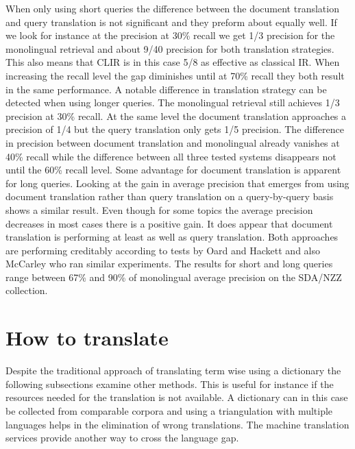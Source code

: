 \documentclass[journal]{IEEEtran}
\begin{document}
When only using short queries the difference between the document translation and query translation is not significant and they preform about equally well.
If we look for instance at the precision at 30\% recall we get 1/3 precision for the monolingual retrieval and about 9/40 precision for both translation strategies.
This also means that CLIR is in this case 5/8 as effective as classical IR.
When increasing the recall level the gap diminishes until at 70\% recall they both result in the same performance.
A notable difference in translation strategy can be detected when using longer queries.
The monolingual retrieval still achieves 1/3 precision at 30\% recall.
At the same level the document translation approaches a precision of 1/4 but the query translation only gets 1/5 precision.
The difference in precision between document translation and monolingual already vanishes at 40\% recall while the difference between all three tested systems disappears not until the 60\% recall level.
Some advantage for document translation is apparent for long queries.
Looking at the gain in average precision that emerges from using document translation rather than query translation on a query-by-query basis shows a similar result.
Even though for some topics the average precision decreases in most cases there is a positive gain.
It does appear that document translation is performing at least as well as query translation.
Both approaches are performing creditably according to tests by Oard and Hackett \cite{oard97b} and also McCarley \cite{mccarley99} who ran similar experiments.
The results for short and long queries range between 67\% and 90\% of monolingual average precision on the SDA/NZZ collection.


\section*{How to translate}
Despite the traditional approach of translating term wise using a dictionary the following subsections examine other methods.
This is useful for instance if the resources needed for the translation is not available.
A dictionary can in this case be collected from comparable corpora and using a triangulation with multiple languages helps in the elimination of wrong translations.
The machine translation services provide another way to cross the language gap.

\setcounter{subsection}{0}
\end{document}
